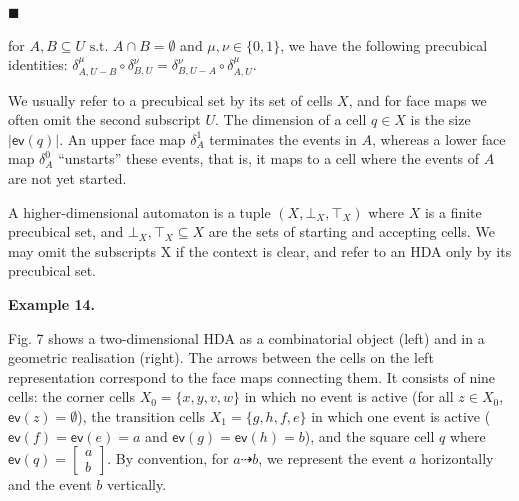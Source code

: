  
 
\par\noindent  $\blacksquare$ 
 
for $A,B\subseteq U\text{ s.t.\ }A\cap B=\emptyset$ and $\mu,\nu\in{\{0,1\}}$, we have the following precubical identities: $\delta_{A,U-B}^{\mu}\circ\delta_{B,U}^{\nu}=\delta_{B,U-A}^{\nu}\circ\delta_{A,U}^{\mu}$.\par
 
 
  
We usually refer to a precubical set by its set of cells $X$, and for face maps we often omit the second subscript $U$. The dimension of a cell $q\in X$ is the size $|\mathsf{ev}(q)|$. An upper face map $\delta_{A}^{1}$ terminates the events in $A$, whereas a lower face map $\delta_{A}^{0}$ “unstarts” these events, that is, it maps to a cell where the events of $A$ are not yet started.\par
 
 
 
A higher-dimensional automaton is a tuple $(X,\bot_{X},\top_{X})$ where $X$ is a finite precubical set, and $\bot_{X},\top_{X}\subseteq X$ are the sets of starting and accepting cells. We may omit the subscripts X if the context is clear, and refer to an HDA only by its precubical set.\par
 
 
 
\par\medskip\noindent\textbf{Example 14.}\par
 
 
Fig. 7 shows a two-dimensional HDA as a combinatorial object (left) and in a geometric realisation (right). The arrows between the cells on the left representation correspond to the face maps connecting them. It consists of nine cells: the corner cells $X_{0}=\{x,y,v,w\}$ in which no event is active (for all $z\in X_{0}$, $\mathsf{ev}(z)=\emptyset$), the transition cells $X_{1}=\{g,h,f,e\}$ in which one event is active ($\mathsf{ev}(f)=\mathsf{ev}(e)=a$ and $\mathsf{ev}(g)=\mathsf{ev}(h)=b$), and the square cell $q$ where $\mathsf{ev}(q)=\left[\begin{smallmatrix}a\\
b\end{smallmatrix}\right]$. By convention, for $a\dashrightarrow b$, we represent the event $a$ horizontally and the event $b$ vertically.\par
 
